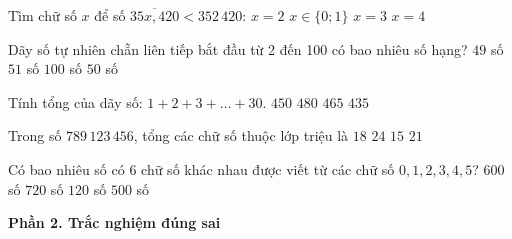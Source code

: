 \begin{ex} %
Tìm chữ số $x$ để số $\overline{35x,420} < 352\,420$:
\choice
{$x = 2$}
{\True $x \in \{0; 1\}$}
{$x = 3$}
{$x = 4$}
\end{ex}

\begin{ex} %
Dãy số tự nhiên chẵn liên tiếp bắt đầu từ 2 đến 100 có bao nhiêu số hạng?
\choice
{$49$ số}
{$51$ số}
{$100$ số}
{\True $50$ số}
\end{ex}

\begin{ex} %
Tính tổng của dãy số: $1 + 2 + 3 + \dots + 30$.
\choice
{$450$}
{$480$}
{\True $465$}
{$435$}
\end{ex}

\begin{ex} %
Trong số $789\,123\,456$, tổng các chữ số thuộc lớp triệu là
\choice
{$18$}
{\True $24$}
{$15$}
{$21$}
\end{ex}

\begin{ex} %
Có bao nhiêu số có 6 chữ số khác nhau được viết từ các chữ số $0, 1, 2, 3, 4, 5$?
\choice
{\True $600$ số}
{$720$ số}
{$120$ số}
{$500$ số}
\end{ex}

\textbf{Phần 2. Trắc nghiệm đúng sai}

